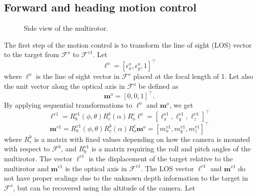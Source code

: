 \subsection{Forward and heading motion control}
\begin{figure}[thpb]
	\centering
	\caption{Side view of the multirotor.}
	\label{side_view}
\end{figure}
The first step of the motion control is to transform the line of sight (LOS) vector to the target from $\mathcal{F}^o$ to $\mathcal{F}^{v1}$. Let 
\begin{equation}
\mathbf{\ell}^o=[\epsilon_x^o, \epsilon_y^o, 1]^\top
\end{equation} where $\ell^o$ is the line of sight vector in $\mathcal{F}^o$ placed at the focal length of 1. Let also the unit vector along the optical axis in $\mathcal{F}^o$ be defined as 
\begin{equation}
\mathbf{m}^o=[0, 0, 1]^\top.
\end{equation}
By applying sequential transformations to $\ell^o$ and $\mathbf{m}^o$, we get
\begin{equation}
\mathbf{\ell}^{v1}=R^{v1}_b(\phi,\theta)R^b_c(\alpha)R^c_o\ell^o=[\ell^{v1}_x, \ell^{v1}_y, \ell^{v1}_z]^\top
\end{equation}
\begin{equation}
\mathbf{m}^{v1}=R^{v1}_b(\phi,\theta)R^b_c(\alpha)R^c_o\mathbf{m}^o=[m^{v1}_x, m^{v1}_y, m^{v1}_z]^\top
\end{equation} where $R^b_c$ is a matrix with fixed values depending on how the camera is mounted with respect to $\mathcal{F}^b$, and $R^{v1}_b$ is a matrix requiring the roll and pitch angles of the multirotor. The vector $\ell^{v1}$ is the displacement of the target relative to the multirotor and $\mathbf{m}^{v1}$ is the optical axis in $\mathcal{F}^{v1}$. The LOS vector $\ell^{v1}$ and $\mathbf{m}^{v1}$ do not have proper scalings due to the unknown depth information to the target in $\mathcal{F}^o$, but can be recovered using the altitude of the camera. Let
